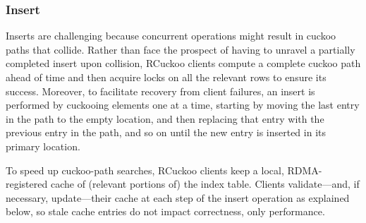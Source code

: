 
\subsubsection{Insert}
\label{sec:insert}

Inserts are challenging because concurrent operations might result in
cuckoo paths that collide.  Rather than face the prospect of having to
unravel a partially completed insert upon collision, RCuckoo clients
compute a complete cuckoo path ahead of time and then acquire locks on
all the relevant rows to ensure its success.  Moreover, to facilitate
recovery from client failures, an insert is performed by cuckooing
elements one at a time, starting by moving the last entry in the path
to the empty location, and then replacing that entry with the previous
entry in the path, and so on until the new entry is inserted in its primary location.


To speed up cuckoo-path searches, RCuckoo clients keep a local,
RDMA-registered cache of (relevant portions of) the index table.
Clients validate---and, if necessary, update---their cache at each
step of the insert operation as explained below, so stale cache
entries do not impact correctness, only performance.







